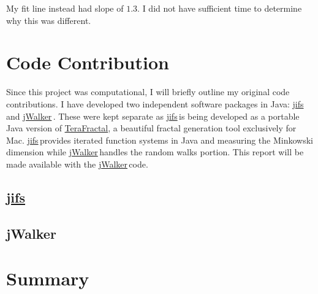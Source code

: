 \documentclass{article}
\newcommand{\jifs}{\href{https://github.com/jmbhughes/jifs}{jifs}\,}
\newcommand{\jwalker}{\href{https://github.com/jmbhughes/jWalker}{jWalker}\,}
\begin{document}
My fit line instead had slope of $1.3$. I did not have sufficient time to determine why this was different. 


\section{Code Contribution}
Since this project was computational, I will briefly outline my original code contributions. I have developed two independent software packages in Java: \jifs and \jwalker. These were kept separate as \jifs is being developed as a portable Java version of \href{https://www.matheasel.com/terafractal/mac/}{TeraFractal}, a beautiful fractal generation tool exclusively for Mac. \jifs provides iterated function systems in Java and measuring the Minkowski dimension while \jwalker handles the random walks portion. This report will be made available with the \jwalker code.

\subsection{\jifs}

\subsection{jWalker}


\section{Summary}

\newpage




\newpage
\end{document}
